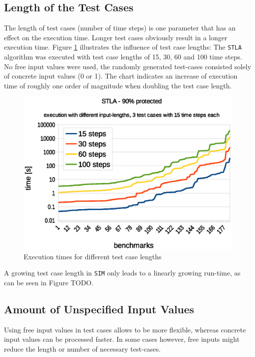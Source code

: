 \documentclass[a4paper,10pt]{article}
\begin{document}
\subsection{Length of the Test Cases}
The length of test cases (number of time steps) is one parameter that has an effect on the execution time. Longer test cases obviously result in a longer execution time.
Figure \ref{stla_input_length_chart} illustrates the influence of test case lengths: The \texttt{STLA} algorithm was executed with test case lengths of 15, 30, 60 and 100 time steps. 
No free input values were used, the randomly generated test-cases consisted solely of concrete input values (0 or 1).
The chart indicates an increase of execution time of roughly one order of magnitude when doubling the test case length.

\begin{figure}[!htb]
\centering
\includegraphics[scale = 0.5]{img/stla_input_length_chart.eps}
\centering \caption{Execution times for different test case lengths} 
\label{stla_input_length_chart}
\end{figure}

A growing test case length in \texttt{SIM} only leads to a linearly growing run-time, as can be seen in Figure TODO. 

\subsection{Amount of Unspecified Input Values} \label{sec_free_inputs}
Using free input values in test cases allows to be more flexible, whereas concrete input values can be processed faster. In some cases however, free inputs might reduce the 
length or number of necessary test-cases.
\end{document}
